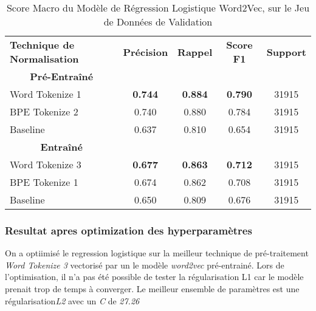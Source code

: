\begin{table}[ht]
    \centering
    \caption{Score Macro du Modèle de Régression Logistique Word2Vec, sur le Jeu de Données de Validation}
    \begin{tabular}{lcccc}
    \hline
    \textbf{Technique de Normalisation} & \textbf{Précision} & \textbf{Rappel} & \textbf{Score F1} & \textbf{Support}  \\
    \multicolumn{1}{c}{\textbf{Pré-Entraîné}} \\
    Word Tokenize 1             & \textbf{0.744}              & \textbf{0.884}           & \textbf{0.790}            & 31915            \\
    BPE Tokenize 2              & 0.740              & 0.880           & 0.784            & 31915            \\ \hline 
    Baseline                     & 0.637              & 0.810           & 0.654            & 31915            \\
    \hline \multicolumn{1}{c}{\textbf{Entraîné}} \\
    Word Tokenize 3             & \textbf{0.677}              & \textbf{0.863}           & \textbf{0.712}            & 31915            \\
    BPE Tokenize 1              & 0.674              & 0.862           & 0.708            & 31915            \\ \hline
    Baseline               & 0.650              & 0.809           & 0.676            & 31915            \\ 
    \hline \end{tabular}
    \label{tab:results}
    \end{table}

\subsubsection{Resultat apres optimization des hyperparamètres}
On a optiimisé le regression logistique sur la meilleur technique de pré-traitement \textit{Word Tokenize 3} vectorisé par un le modèle \textit{word2vec} pré-entrainé.
Lors de l'optimisation, il n'a pas été possible de tester la régularisation L1 car le modèle prenait trop de temps à converger. 
Le meilleur ensemble de paramètres est une régularisation\textit{L2 }avec un \textit{C} de \textit{27.26}

